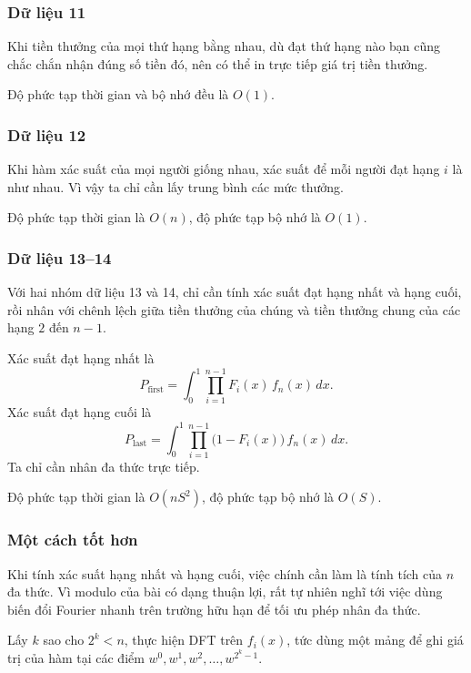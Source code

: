 \documentclass[11pt]{article}
\begin{document}
\subsubsection{Dữ liệu 11}

Khi tiền thưởng của mọi thứ hạng bằng nhau, dù đạt thứ hạng nào bạn cũng chắc
chắn nhận đúng số tiền đó, nên có thể in trực tiếp giá trị tiền thưởng.

Độ phức tạp thời gian và bộ nhớ đều là \(O(1)\).

\subsubsection{Dữ liệu 12}

Khi hàm xác suất của mọi người giống nhau, xác suất để mỗi người đạt hạng \(i\)
là như nhau. Vì vậy ta chỉ cần lấy trung bình các mức thưởng.

Độ phức tạp thời gian là \(O(n)\), độ phức tạp bộ nhớ là \(O(1)\).

\subsubsection{Dữ liệu 13--14}

Với hai nhóm dữ liệu 13 và 14, chỉ cần tính xác suất đạt hạng nhất và hạng cuối,
rồi nhân với chênh lệch giữa tiền thưởng của chúng và tiền thưởng chung của các
hạng \(2\) đến \(n-1\).

Xác suất đạt hạng nhất là
\[
  P_{\mathrm{first}}=
  \int_0^1
  \prod_{i=1}^{n-1}F_i(x)\, f_n(x)\,dx. \tag{10}
\]
Xác suất đạt hạng cuối là
\[
  P_{\mathrm{last}}=
  \int_0^1
  \prod_{i=1}^{n-1}\bigl(1-F_i(x)\bigr)\, f_n(x)\,dx. \tag{11}
\]
Ta chỉ cần nhân đa thức trực tiếp.

Độ phức tạp thời gian là \(O(nS^2)\), độ phức tạp bộ nhớ là \(O(S)\).

\subsubsection{Một cách tốt hơn}

Khi tính xác suất hạng nhất và hạng cuối, việc chính cần làm là tính tích của
\(n\) đa thức. Vì modulo của bài có dạng thuận lợi, rất tự nhiên nghĩ tới việc
dùng biến đổi Fourier nhanh trên trường hữu hạn để tối ưu phép nhân đa thức.

Lấy \(k\) sao cho \(2^k<n\), thực hiện DFT trên \(f_i(x)\), tức dùng một mảng để
ghi giá trị của hàm tại các điểm \(w^0,w^1,w^2,\ldots,w^{2^k-1}\).
\end{document}
